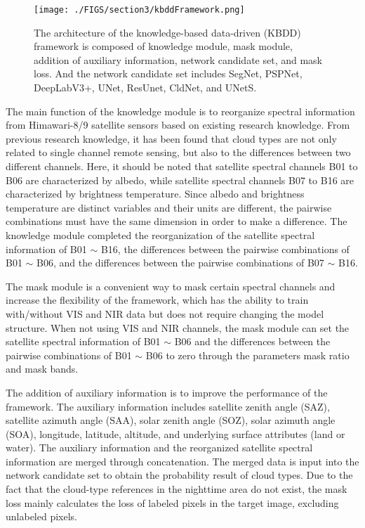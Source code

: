 \documentclass[review]{elsarticle}
\begin{document}
\begin{figure}[!htp]
    \centering
    \texttt{[image: ./FIGS/section3/kbddFramework.png]}
    \caption{The architecture of the knowledge-based data-driven (KBDD) framework is composed of knowledge module, mask module, addition of auxiliary information, network candidate set, and mask loss. And the network candidate set includes SegNet, PSPNet, DeepLabV3+, UNet, ResUnet, CldNet, and UNetS.}
    \label{fig:KBDD}
\end{figure}

The main function of the knowledge module is to reorganize spectral information from Himawari-8/9 satellite sensors based on existing research knowledge.
From previous research knowledge, it has been found that cloud types are not only related to single channel remote sensing, but also to the differences between two different channels.
Here, it should be noted that satellite spectral channels B01 to B06 are characterized by albedo, while satellite spectral channels B07 to B16 are characterized by brightness temperature.
Since albedo and brightness temperature are distinct variables and their units are different, the pairwise combinations must have the same dimension in order to make a difference.
The knowledge module completed the reorganization of the satellite spectral information of B01 $\sim$ B16, the differences between the pairwise combinations of B01 $\sim$ B06, and the differences between the pairwise combinations of B07 $\sim$ B16.

The mask module is a convenient way to mask certain spectral channels and increase the flexibility of the framework, which has the ability to train with/without VIS and NIR data but does not require changing the model structure.
When not using VIS and NIR channels, the mask module can set the satellite spectral information of B01 $\sim$ B06 and the differences between the pairwise combinations of B01 $\sim$ B06 to zero through the parameters mask ratio and mask bands.

The addition of auxiliary information is to improve the performance of the framework.
The auxiliary information includes satellite zenith angle (SAZ), satellite azimuth angle (SAA), solar zenith angle (SOZ), solar azimuth angle (SOA), longitude, latitude, altitude, and underlying surface attributes (land or water).
The auxiliary information and the reorganized satellite spectral information are merged through concatenation.
The merged data is input into the network candidate set to obtain the probability result of cloud types.
Due to the fact that the cloud-type references in the nighttime area do not exist, the mask loss mainly calculates the loss of labeled pixels in the target image, excluding unlabeled pixels.
\end{document}

